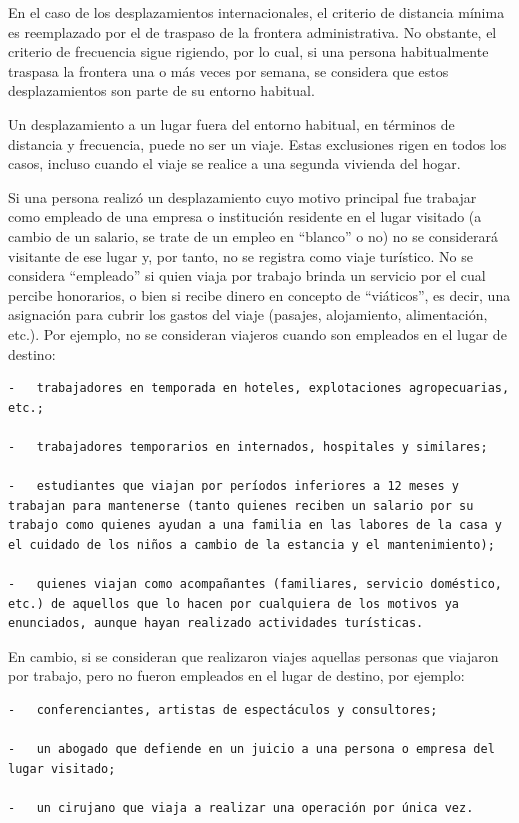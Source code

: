 \documentclass[
  openany]{book}
\begin{document}
En el caso de los desplazamientos internacionales, el criterio de distancia mínima es reemplazado por el de traspaso de la frontera administrativa. No obstante, el criterio de frecuencia sigue rigiendo, por lo cual, si una persona habitualmente traspasa la frontera una o más veces por semana, se considera que estos desplazamientos son parte de su entorno habitual.

Un desplazamiento a un lugar fuera del entorno habitual, en términos de distancia y frecuencia, puede no ser un viaje. Estas exclusiones rigen en todos los casos, incluso cuando el viaje se realice a una segunda vivienda del hogar.

Si una persona realizó un desplazamiento cuyo motivo principal fue trabajar como empleado de una empresa o institución residente en el lugar visitado (a cambio de un salario, se trate de un empleo en ``blanco'' o no) no se considerará visitante de ese lugar y, por tanto, no se registra como viaje turístico. No se considera ``empleado'' si quien viaja por trabajo brinda un servicio por el cual percibe honorarios, o bien si recibe dinero en concepto de ``viáticos'', es decir, una asignación para cubrir los gastos del viaje (pasajes, alojamiento, alimentación, etc.). Por ejemplo, no se consideran viajeros cuando son empleados en el lugar de destino:

\begin{verbatim}
-   trabajadores en temporada en hoteles, explotaciones agropecuarias, etc.;

-   trabajadores temporarios en internados, hospitales y similares;

-   estudiantes que viajan por períodos inferiores a 12 meses y trabajan para mantenerse (tanto quienes reciben un salario por su trabajo como quienes ayudan a una familia en las labores de la casa y el cuidado de los niños a cambio de la estancia y el mantenimiento);

-   quienes viajan como acompañantes (familiares, servicio doméstico, etc.) de aquellos que lo hacen por cualquiera de los motivos ya enunciados, aunque hayan realizado actividades turísticas.
\end{verbatim}

En cambio, si se consideran que realizaron viajes aquellas personas que viajaron por trabajo, pero no fueron empleados en el lugar de destino, por ejemplo:

\begin{verbatim}
-   conferenciantes, artistas de espectáculos y consultores;

-   un abogado que defiende en un juicio a una persona o empresa del lugar visitado;

-   un cirujano que viaja a realizar una operación por única vez.
\end{verbatim}
\end{document}

